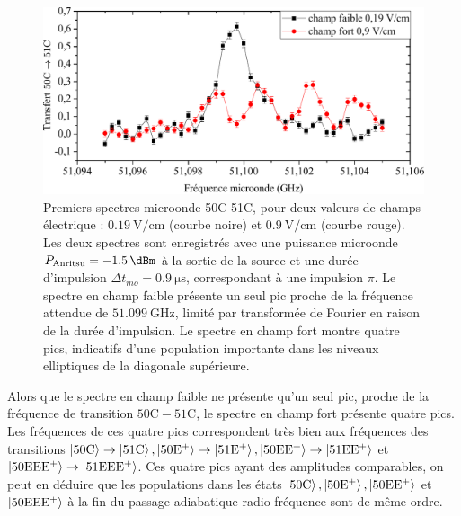 \begin{figure}[h]
\centering
\includegraphics[width=.9\linewidth]{figures/circulars/spectre_50C51C_nofield-field}
\caption[Premiers spectres microonde 50C-51C]{
Premiers spectres microonde 50C-51C, pour deux valeurs de champs électrique :
$\SI{0.19}{\V/\cm}$ (courbe noire) et $\SI{0.9}{\V/\cm}$ (courbe rouge).
Les deux spectres sont enregistrés avec une puissance microonde $P_{\text{Anritsu}} = \SI{-1.5}{\dBm}$ à la sortie de la source et une durée d'impulsion $\Delta t _{mo} = \SI{0.9}{\us}$, correspondant à une impulsion $\pi$.
Le spectre en champ faible présente un seul pic proche de la fréquence attendue de $\SI{51.099}{\GHz}$, limité par transformée de Fourier en raison de la durée d'impulsion.
Le spectre en champ \og fort \fg{} montre quatre pics, indicatifs d'une population importante dans les niveaux elliptiques de la diagonale supérieure.
}
\label{fig:spectre_50C51C_nofield-field}
\end{figure}

Alors que le spectre en champ faible ne présente qu'un seul pic, proche de la fréquence de transition $\mathrm{50C-51C}$, le spectre en champ fort présente quatre pics.
Les fréquences de ces quatre pics correspondent très bien aux fréquences des transitions
$\mathrm{\ket{50C}\rightarrow\ket{51C}, \ket{50E^+}\rightarrow\ket{51E^+}, \ket{50EE^+}\rightarrow\ket{51EE^+}}$ et $\mathrm{\ket{50EEE^+}\rightarrow\ket{51EEE^+}}$.
Ces quatre pics ayant des amplitudes comparables, on peut en déduire que les populations dans les états
$\mathrm{\ket{50C}, \ket{50E^+}, \ket{50EE^+}}$ et $\mathrm{\ket{50EEE^+}}$ à la fin du passage adiabatique radio-fréquence sont de même ordre.

